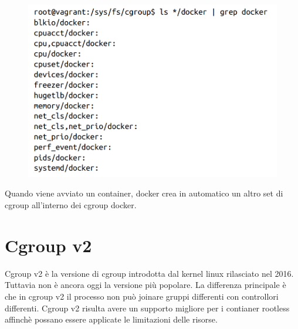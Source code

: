 \begin{figure}[H]
    \centering
    \includegraphics[width=\textwidth, keepaspectratio]{capitoli/os_security/imgs/docker1.png}
\end{figure}

Quando viene avviato un container, docker crea in automatico un altro set di cgroup
all'interno dei cgroup docker.

\section{Cgroup v2}

Cgroup v2 è la versione di cgroup introdotta dal kernel linux rilasciato nel 2016.
Tuttavia non è ancora oggi la versione più popolare. La differenza principale
è che in cgroup v2 il processo non può joinare gruppi differenti con controllori
differenti. Cgroup v2 risulta avere un supporto migliore per i contianer rootless
affinchè possano essere applicate le limitazioni delle risorse.